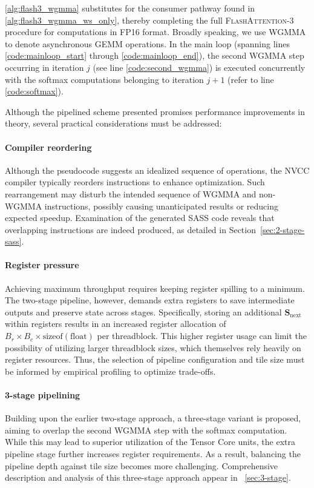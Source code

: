 \cref{alg:flash3_wgmma} substitutes for the consumer pathway found in \cref{alg:flash3_wgmma_ws_only}, thereby completing the full \textsc{FlashAttention-3} procedure for computations in FP16 format. Broadly speaking, we use WGMMA to denote asynchronous GEMM operations. In the main loop (spanning lines \ref{code:mainloop_start} through \ref{code:mainloop_end}), the second WGMMA step occurring in iteration $j$ (see line \ref{code:second_wgmma}) is executed concurrently with the softmax computations belonging to iteration $j+1$ (refer to line \ref{code:softmax}).

Although the pipelined scheme presented promises performance improvements in theory, several practical considerations must be addressed:

\paragraph{Compiler reordering} Although the pseudocode suggests an idealized sequence of operations, the NVCC compiler typically reorders instructions to enhance optimization. Such rearrangement may disturb the intended sequence of WGMMA and non-WGMMA instructions, possibly causing unanticipated results or reducing expected speedup. Examination of the generated SASS code reveals that overlapping instructions are indeed produced, as detailed in Section~\ref{sec:2-stage-sass}.

\paragraph{Register pressure} Achieving maximum throughput requires keeping register spilling to a minimum. The two-stage pipeline, however, demands extra registers to save intermediate outputs and preserve state across stages. Specifically, storing an additional $\mathbf{S}_{\mathrm{next}}$ within registers results in an increased register allocation of $B_r \times B_c \times \text{sizeof}(\text{float})$ per threadblock. This higher register usage can limit the possibility of utilizing larger threadblock sizes, which themselves rely heavily on register resources. Thus, the selection of pipeline configuration and tile size must be informed by empirical profiling to optimize trade-offs.

\paragraph{3-stage pipelining} Building upon the earlier two-stage approach, a three-stage variant is proposed, aiming to overlap the second WGMMA step with the softmax computation. While this may lead to superior utilization of the Tensor Core units, the extra pipeline stage further increases register requirements. As a result, balancing the pipeline depth against tile size becomes more challenging. Comprehensive description and analysis of this three-stage approach appear in ~\cref{sec:3-stage}.


